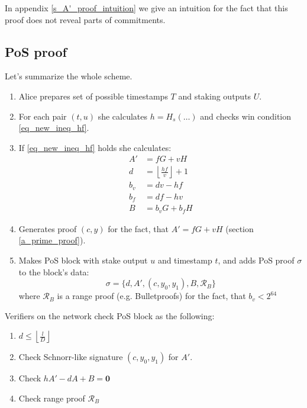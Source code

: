 \documentclass{article}
\newcommand{\floor}[1]{\left\lfloor #1 \right\rfloor}
\numberwithin{figure}{section}
\begin{document}
In appendix \ref{s_A'_proof_intuition} we give an intuition for the fact that this proof does not reveal parts of commitments.

\subsection{PoS proof} \label{ssec_pos_proof}

Let's summarize the whole scheme.

\begin{enumerate}
    \item Alice prepares set of possible timestamps $T$ and staking outputs $U$.
    
    \item For each pair $(t, u)$ she calculates $h = H_s(\dots)$ and checks win condition \eqref{eq_new_ineq_hf}.
    
    \item If \eqref{eq_new_ineq_hf} holds she calculates:
    \[ \begin{split}
    A' &= fG + vH \\
    d &= \floor{\frac{hf}{v}} + 1\\
    b_v &= dv - hf \\
    b_f &= df - hv \\
    B &= b_v G + b_f H
    \end{split}
    \]
    
    \item Generates proof $(c, y)$ for the fact, that $A' = fG + vH$ (section \ref{a_prime_proof}).
    
    \item Makes PoS block with stake output $u$ and timestamp $t$, and adds PoS proof $\sigma$ to the block's data:
    \begin{equation} \label{eq_pos_proof}
    \sigma = \{ d, A', (c, y_0, y_1), B, \mathcal{R}_B \}
    \end{equation}
    where $\mathcal{R}_B$ is a range proof (e.g. Bulletproofs) for the fact, that $b_v < 2^{64}$ 
\end{enumerate}

\noindent 
Verifiers on the network check PoS block as the following:

\begin{enumerate}
    \item $d \leq \floor{\frac{l}{D}}$
    
    \item Check Schnorr-like signature $(c, y_0, y_1)$ for $A'$.
    
    \item Check $hA'-dA+B=\mathbf{0}$
    
    \item Check range proof $\mathcal{R}_B$
\end{enumerate}
\end{document}
